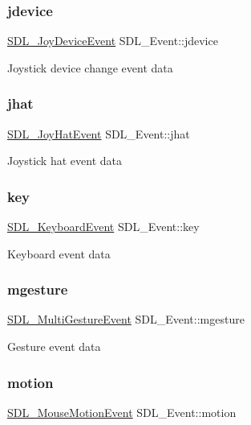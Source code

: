 \subsubsection{\texorpdfstring{jdevice}{jdevice}}
{\footnotesize\ttfamily \mbox{\hyperlink{struct_s_d_l___joy_device_event}{S\+D\+L\+\_\+\+Joy\+Device\+Event}} S\+D\+L\+\_\+\+Event\+::jdevice}

Joystick device change event data \mbox{\label{union_s_d_l___event_a421b40e0f8e01f181c8d5548cff1dd1d}} 
\subsubsection{\texorpdfstring{jhat}{jhat}}
{\footnotesize\ttfamily \mbox{\hyperlink{struct_s_d_l___joy_hat_event}{S\+D\+L\+\_\+\+Joy\+Hat\+Event}} S\+D\+L\+\_\+\+Event\+::jhat}

Joystick hat event data \mbox{\label{union_s_d_l___event_ab99927835cc77a9b6bb50b419b4a27df}} 
\subsubsection{\texorpdfstring{key}{key}}
{\footnotesize\ttfamily \mbox{\hyperlink{struct_s_d_l___keyboard_event}{S\+D\+L\+\_\+\+Keyboard\+Event}} S\+D\+L\+\_\+\+Event\+::key}

Keyboard event data \mbox{\label{union_s_d_l___event_ac19b3c6a6b5181a51eb4fbe2cbe726a9}} 
\subsubsection{\texorpdfstring{mgesture}{mgesture}}
{\footnotesize\ttfamily \mbox{\hyperlink{struct_s_d_l___multi_gesture_event}{S\+D\+L\+\_\+\+Multi\+Gesture\+Event}} S\+D\+L\+\_\+\+Event\+::mgesture}

Gesture event data \mbox{\label{union_s_d_l___event_ac3c89e190faacbe84280cd539453bab6}} 
\subsubsection{\texorpdfstring{motion}{motion}}
{\footnotesize\ttfamily \mbox{\hyperlink{struct_s_d_l___mouse_motion_event}{S\+D\+L\+\_\+\+Mouse\+Motion\+Event}} S\+D\+L\+\_\+\+Event\+::motion}

